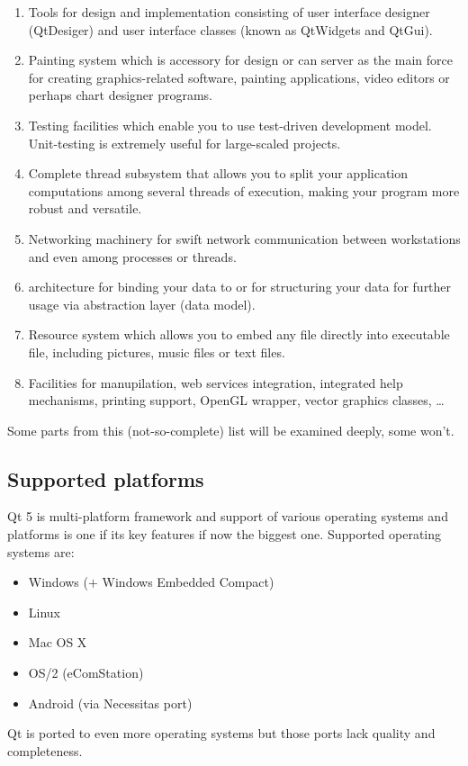 \begin{enumerate}
\item Tools for  design and implementation consisting of user interface designer (QtDesiger) and user interface classes (known as QtWidgets and QtGui).
\item Painting system which is accessory for  design or can server as the main force for creating graphics-related software, \eg painting applications, video editors or perhaps chart designer programs.
\item Testing facilities which enable you to use test-driven development model. Unit-testing is extremely useful for large-scaled projects.
\item Complete thread subsystem that allows you to split your application computations among several threads of execution, making your program more robust and versatile.
\item Networking machinery for swift network communication between workstations and even among processes or threads.
\item {} architecture for binding your data to  or for structuring your data for further usage via abstraction layer (data model).
\item Resource system which allows you to embed any file directly into executable file, including pictures, music files or text files.
\item Facilities for  manupilation, web services integration, integrated help mechanisms, printing support, OpenGL wrapper, vector graphics classes, \ldots
\end{enumerate}

Some parts from this (not-so-complete) list will be examined deeply, some won't.

\subsection{Supported platforms}
Qt 5 is multi-platform framework and support of various operating systems and platforms is one if its key features if now the biggest one. Supported operating systems are:
\begin{itemize}
\item Windows ($+$ Windows Embedded Compact)
\item Linux
\item Mac OS X
\item OS/2 (eComStation)
\item Android (via Necessitas port)
\end{itemize}
Qt is ported to even more operating systems but those ports lack quality and completeness.

